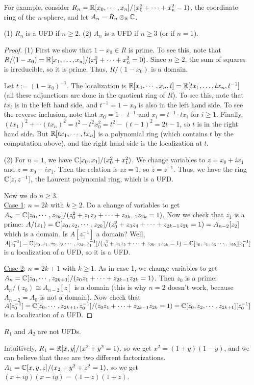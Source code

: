  For example, consider $R_n=\mathbb{R}[x_0,\cdots ,x_n]/(x_0^2+\cdots +x_n^2-1)$, the coordinate
 ring of the $n$-sphere, and let $A_n=R_n\otimes_{\mathbb{R}} \mathbb{C}$.
 \begin{theorem}
   (1) $R_n$ is a UFD if $n\ge 2$. (2) $A_n$ is a UFD if $n\ge 3$ (or if $n=1$).
 \end{theorem}
 \begin{proof}
   (1) First we show that $1-x_0\in R$ is prime. To see this, note that
   $R/(1-x_0)=\mathbb{R}[x_1,\dots, x_n]/(x_1^2+\cdots +x_n^2=0)$. Since $n\ge 2$, the sum of
   squares is irreducible, so it is prime. Thus, $R/(1-x_0)$ is a domain.

   Let $t:=(1-x_0)^{-1}$. The localization is $\mathbb{R}[x_0,\cdots ,x_n,t] = \mathbb{R}[tx_1,\dots,
   tx_n,t^{-1}]$ (all these adjunctions are done in the quotient ring of $R$). To see
   this, note that $tx_i$ is in the left hand side, and $t^{-1}=1-x_0$ is also in the
   left hand side. To see the reverse inclusion, note that $x_0=1-t^{-1}$ and
   $x_i=t^{-1}\cdot tx_i$ for $i\ge 1$. Finally, $(tx_1)^2+\cdots
   (tx_n)^2=t^2-t^2x_0^2=t^2-(t-1)^2=2t-1$, so $t$ is in the right hand side. But
   $\mathbb{R}[tx_1,\cdots, tx_n]$ is a polynomial ring (which contains $t$ by the computation
   above), and the right hand side is the localization at $t$.

   (2) For $n=1$, we have $\mathbb{C}[x_0,x_1]/(x_0^2+x_1^2)$. We change variables to
   $z=x_0+ix_1$ and $\bar z=x_0-ix_1$. Then the relation is $z\bar z=1$, so $\bar
   z=z^{-1}$. Thus, we have the ring $\mathbb{C}[z,z^{-1}]$, the Laurent polynomial ring, which
   is a UFD.

   Now we do $n\ge 3$.\\
   \underline{Case 1}: $n=2k$ with $k\ge 2$. Do a change of variables to get
   $A_n=\mathbb{C}[z_0,\cdots, z_{2k}]/(z_0^2+z_1z_2+\cdots +z_{2k-1}z_{2k}=1)$. Now we check
   that $z_1$ is a prime: $A/(z_1)=\mathbb{C}[z_0, z_2,\cdots, z_{2k}]/(z_0^2+z_3z_4+\cdots
   +z_{2k-1}z_{2k}=1) = A_{n-2}[z_2]$ which is a domain. Is $A[z_1^{-1}]$ a domain? Well,
   $A[z_1^{-1}]=\CC[z_0,z_1,\rlap{\rule[3pt]{6pt}{.4pt}}z_2,z_3\cdots, z_{2k},
   z_1^{-1}]/(z_0^2+z_1z_2+\cdots +z_{2k-1}z_{2k}=1) = \CC[z_0,z_1,z_3\cdots,
   z_{2k}][z_1^{-1}]$ is a localization of a UFD, so it is a UFD.

   \noindent \underline{Case 2}: $n=2k+1$ with $k\ge 1$. As in case 1, we change
   variables to get $A_n=\mathbb{C}[z_0,\cdots, z_{2k+1}]/(z_0z_1+\cdots +z_{2k-1}z_{2k}=1)$.
   Then $z_0$ is a prime: $A_n/(z_0)\cong A_{n-2}[z]$ is a domain (this is why $n=2$
   doesn't work, because $A_{n-2}=A_0$ is not a domain). Now check that
   $A[z_0^{-1}]=\mathbb{C}[z_0,\cdots, z_{2k+1},z_0^{-1}]/(z_0z_1+\cdots +z_{2k-1}z_{2k}=1) =
   \mathbb{C}[z_0,z_2,\cdots, z_{2k+1}][z_0^{-1}]$ is a localization of a UFD.
 \end{proof}
 \begin{theorem}
   $R_1$ and $A_2$ are not UFDs.
 \end{theorem}
 Intuitively, $R_1=\mathbb{R}[x,y]/(x^2+y^2=1)$, so we get $x^2=(1+y)(1-y)$, and we can believe
 that these are two different factorizations. $A_1=\mathbb{C}[x,y,z]/(x_2+y^2+z^2=1)$, so we get
 $(x+iy)(x-iy)=(1-z)(1+z)$.


